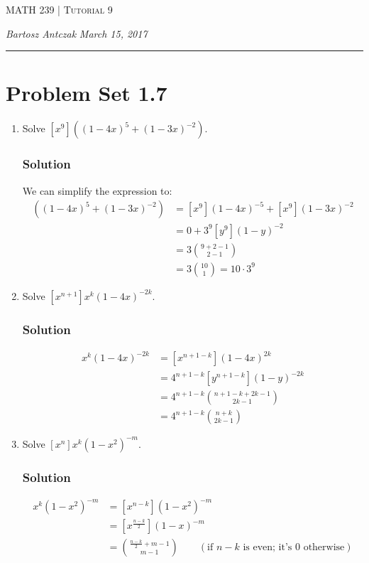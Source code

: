 \documentclass{report}
\newcommand{\lectureNum}{9}
\newcommand{\curDate}{March 15, 2017}
\newcommand{\course}{MATH 239}
\def\part#1{\item[\bf #1)]}
\begin{document}
\begin{center}
\begin{Large}
\textsc{\course{} | Tutorial \lectureNum{}}
\end{Large}
\end{center} 
\noindent \textit{Bartosz Antczak} \hfill
\textit{\curDate{}}
\rule{\textwidth}{0.4pt}
\section*{Problem Set 1.7}
\begin{enumerate}
\part{d} Solve $[x^9]((1-4x)^5+(1-3x)^{-2})$.
\subsubsection{Solution}
We can simplify the expression to:
\begin{align*}
[x^9]((1-4x)^5+(1-3x)^{-2}) &= [x^9](1-4x)^{-5} + [x^9](1-3x)^{-2} \\
&= 0 + 3^9[y^9](1-y)^{-2} \\
&= 3 {9 + 2 - 1 \choose 2 - 1} \\
&= 3 {10 \choose 1} = 10 \cdot 3^9
\end{align*}
\part{f} Solve $[x^{n+1}]x^k(1-4x)^{-2k}$.
\subsubsection{Solution}
\begin{align*}
[x^{n+1}]x^k(1-4x)^{-2k} &= [x^{n+1-k}](1-4x)^{2k} \\
&= 4^{n+1-k}[y^{n+1-k}](1-y)^{-2k} \\
&= 4^{n+1-k}{n+1-k+2k - 1 \choose 2k-1} \\
&= 4^{n+1-k} {n+k \choose 2k-1}
\end{align*}
\part{g} Solve $[x^n]x^k(1-x^2)^{-m}$.
\subsubsection{Solution}
\begin{align*}
[x^n]x^k(1-x^2)^{-m} &= [x^{n-k}](1-x^2)^{-m}\\
&= [x^{\frac{n-k}{2}}](1-x)^{-m} \\
&= {\frac{n-k}{2} + m - 1 \choose m-1} \qquad (\text{if }n-k\text{ is even; it's 0 otherwise})
\end{align*}
\end{enumerate}
\newpage
\end{document}
